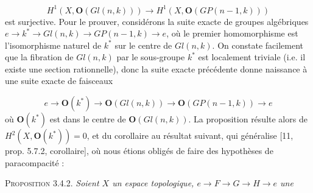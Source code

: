 \[
H^1(X,\mathbf O(\mathit{Gl}(n,k)))
\to
H^1(X,\mathbf O(\mathit{GP}(n-1,k)))
\]
est surjective. Pour le prouver, considérons la suite exacte de groupes
algébriques
$e\to k^*\to\mathit{Gl}(n,k)\to\mathit{GP}(n-1,k)\to e$,
où le premier homomorphisme est l'isomorphisme naturel de $k^*$ sur le centre
de $\mathit{Gl}(n,k)$. On constate facilement que la fibration de
$\mathit{Gl}(n,k)$ par le sous-groupe $k^*$ est localement triviale
(i.e. il existe une section rationnelle), donc la suite exacte précédente
donne naissance à une suite exacte de faisceaux

\[
e\to\mathbf O(k^*)
\to\mathbf O(\mathit{Gl}(n,k))
\to\mathbf O(\mathit{GP}(n-1,k))
\to e
\]
où $\mathbf O(k^*)$ est dans le centre de
$\mathbf O(\mathit{Gl}(n,k))$. La proposition résulte alors de
$H^2(X,\mathbf O(k^*))=0$, et du corollaire au résultat suivant, qui
généralise [11, prop. 5.7.2, corollaire], où nous étions obligés de faire des
hypothèses de paracompacité :

\indent\textsc{Proposition 3.4.2.} \textit{Soient $X$ un espace topologique,
$e\to F\to G\to H\to e$ une}

